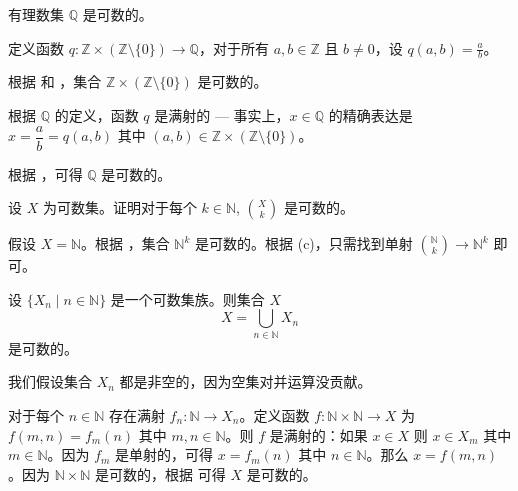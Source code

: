 \begin{theorem}
\label{thmRationalsAreCountable}
有理数集 $\mathbb{Q}$ 是可数的。
\end{theorem}

\begin{cproof}
定义函数 $q : \mathbb{Z} \times (\mathbb{Z} \setminus \{ 0 \}) \to \mathbb{Q}$，对于所有 $a,b \in \mathbb{Z}$ 且 $b \ne 0$，设 $q(a,b) = \frac{a}{b}$。

根据  和 ，集合 $\mathbb{Z} \times (\mathbb{Z} \setminus \{ 0 \})$ 是可数的。

根据 $\mathbb{Q}$ 的定义，函数 $q$ 是满射的 --- 事实上，$x \in \mathbb{Q}$ 的精确表达是 $x = \dfrac{a}{b} = q(a,b)$ 其中 $(a,b) \in \mathbb{Z} \times (\mathbb{Z} \setminus \{ 0 \})$。

根据 ，可得 $\mathbb{Q}$ 是可数的。
\end{cproof}

\begin{exercise} \label{exFiniteSubsetsCountableFixedSize}
设 $X$ 为可数集。证明对于每个 $k \in \mathbb{N}$, $\binom{X}{k}$ 是可数的。
\begin{backhint}
假设 $X=\mathbb{N}$。根据 ，集合 $\mathbb{N}^k$ 是可数的。根据 (c)，只需找到单射 $\binom{\mathbb{N}}{k} \to \mathbb{N}^k$ 即可。
\end{backhint}
\end{exercise}

\begin{theorem}[可数多个可数集得并集是可数的]
\label{thmCountableUnionOfCountableSetIsCountable}
设 $\{ X_n \mid n \in \mathbb{N} \}$ 是一个可数集族。则集合 $X$ 
\[ X = \bigcup_{n \in \mathbb{N}} X_n \]
是可数的。
\end{theorem}

\begin{cproof}
我们假设集合 $X_n$ 都是非空的，因为空集对并运算没贡献。

对于每个 $n \in \mathbb{N}$ 存在满射 $f_n : \mathbb{N} \to X_n$。定义函数 $f : \mathbb{N} \times \mathbb{N} \to X$ 为 $f(m,n)=f_m(n)$ 其中 $m,n \in \mathbb{N}$。则 $f$ 是满射的：如果 $x \in X$ 则 $x \in X_m$ 其中 $m \in \mathbb{N}$。因为 $f_m$ 是单射的，可得 $x=f_m(n)$ 其中 $n \in \mathbb{N}$。那么 $x=f(m,n)$。因为 $\mathbb{N} \times \mathbb{N}$ 是可数的，根据  可得 $X$ 是可数的。
\end{cproof}

